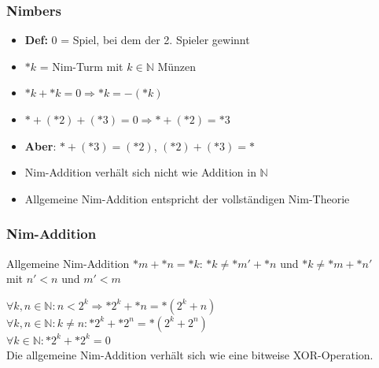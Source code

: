 \documentclass[12pt, aspectratio=169]{beamer}
\begin{document}
\begin{frame}
    \frametitle{Nimbers}
    \begin{itemize}
        \item<1-> \textbf{Def:} $0$ = Spiel, bei dem der 2. Spieler gewinnt
        \item<2-> $*k$ = Nim-Turm mit $k \in \mathbb{N}$ Münzen 
        \item<3-> $*k + *k = 0 \Rightarrow *k = - (*k)$
        \item<4-> $* + (*2) + (*3) = 0 \Rightarrow * + (*2) = *3$
        \item<4-> \textbf{Aber}: $* + (*3) = (*2)$, $(*2) + (*3) = *$
        \item<4-> Nim-Addition verhält sich nicht wie Addition in $\mathbb{N}$
        \item<5-> Allgemeine Nim-Addition entspricht der vollständigen Nim-Theorie
    \end{itemize}
    
\end{frame}

\begin{frame}
    \frametitle{Nim-Addition}
    \begin{block}{Allgemeine Nim-Addition}
        \centering
        $*m + *n = *k$: $*k \neq *m' + *n$ und $*k \neq *m + *n'$ \\ mit $n' < n$ und $m' < m$
    \end{block}
     {
        $\forall k,n \in \mathbb{N}\colon n < 2^k \Rightarrow *2^k + *n = *(2^k + n)$ \\
    }
     {
        $\forall k,n \in \mathbb{N}\colon k \neq n: *2^k + *2^n = *(2^k + 2^n)$ \\
        $\forall k \in \mathbb{N}\colon *2^k + *2^k = 0$ \\
    }
     {
        \vspace*{20px}
        \alert{Die allgemeine Nim-Addition verhält sich wie eine bitweise XOR-Operation.}
    }
\end{frame}
\end{document}
